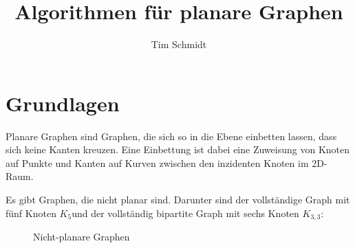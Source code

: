 \documentclass[10pt,a4paper]{article}
\author{Tim Schmidt}
\title{Algorithmen für planare Graphen}
\makeatletter
\def\maxwidth#1{\ifdim\Gin@nat@width>#1 #1\else\Gin@nat@width\fi}
\newcommand{\imageFigureMult}[6]{%
    \imageFigureMultS{#1}{#2}{#3}{#4}{#5}{#6}{0.45}%
}
\newcommand{\imageFigureMultS}[7]{%
    \begin{figure}[h]%
        \centering
        \subfloat[#1]{{\texttt{[image: \#2]} }}%
        \qquad
        \subfloat[#3]{{\texttt{[image: \#4]} }}%
        \caption{#5}%
        \label{fig:#6}%
    \end{figure}
}
\newcommand{\Kf}{$K_5$}
\newcommand{\Kdd}{$K_{3,3}$}
\makeatother
\begin{document}
	{\let\newpage\relax\maketitle}
	\tableofcontents
	\newpage
	\setcounter{page}{1}


\section{Grundlagen}
Planare Graphen sind Graphen, die sich so in die Ebene einbetten lassen, dass
sich keine Kanten kreuzen.
Eine Einbettung ist dabei eine Zuweisung von Knoten auf Punkte und Kanten auf
Kurven zwischen den inzidenten Knoten im 2D-Raum.

Es gibt Graphen, die nicht planar sind.
Darunter sind der vollständige Graph mit fünf Knoten \Kf und der vollständig
bipartite Graph mit sechs Knoten \Kdd:

\imageFigureMult{\Kf}{k5.png}{\Kdd}{k33.png}{Nicht-planare Graphen}{nonplanar}
\end{document}
